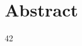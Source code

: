 \documentclass[preamble.tex]{subfiles}
\begin{document}
\pagebreak

\chapter*{Abstract}
42
\end{document}
